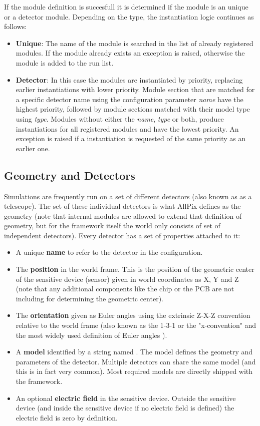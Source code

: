 If the module definition is succesfull it is determined if the module is an unique or a detector module. Depending on the type, the instantiation logic continues as follows:
\begin{itemize}
\item \textbf{Unique}: The name of the module is searched in the list of already registered modules. If the module already exists an exception is raised, otherwise the module is added to the run list.
\item \textbf{Detector}: In this case the modules are instantiated by priority, replacing earlier instantiations with lower priority. Module section that are matched for a specific detector name using the configuration parameter \textit{name} have the highest priority, followed by module sections matched with their model type using \textit{type}. Modules without either the \textit{name}, \textit{type} or both, produce instantiations for all registered modules and have the lowest priority. An exception is raised if a instantiation is requested of the same priority as an earlier one.
\end{itemize}

\subsection{Geometry and Detectors}
\label{sec:models_geometry}
Simulations are frequently run on a set of different detectors (also known as as a telescope). The set of these individual detectors is what AllPix defines as the geometry (note that internal modules are allowed to extend that definition of geometry, but for the framework itself the world only consists of set of independent detectors). Every detector has a set of properties attached to it:
\begin{itemize}
\item A unique \textbf{name} to refer to the detector in the configuration.
\item The \textbf{position} in the world frame. This is the position of the geometric center of the sensitive device (sensor) given in world coordinates as X, Y and Z (note that any additional components like the chip or the PCB are not including for determining the geometric center).
\item The \textbf{orientation} given as Euler angles using the extrinsic Z-X-Z convention relative to the world frame (also known as the 1-3-1 or the "x-convention" and the most widely used definition of Euler angles \needcite). 
\item A \textbf{model} identified by a string named . The model defines the geometry and parameters of the detector. Multiple detectors can share the same model (and this is in fact very common). Most required models are directly shipped with the framework.
\item An optional \textbf{electric field} in the sensitive device. Outside the sensitive device (and inside the sensitive device if no electric field is defined) the electric field is zero by definition.
\end{itemize}

